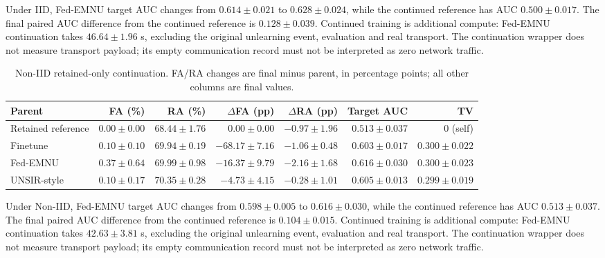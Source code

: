 Under IID, Fed-EMNU target AUC changes from $0.614 \pm 0.021$ to $0.628 \pm 0.024$, while the continued reference has AUC $0.500 \pm 0.017$. The final paired AUC difference from the continued reference is $0.128 \pm 0.039$. Continued training is additional compute: Fed-EMNU continuation takes $46.64 \pm 1.96$ s, excluding the original unlearning event, evaluation and real transport. The continuation wrapper does not measure transport payload; its empty communication record must not be interpreted as zero network traffic.

\begin{table}[H]\centering\scriptsize\setlength{\tabcolsep}{3pt}

\caption{Non-IID retained-only continuation. FA/RA changes are final minus parent, in percentage points; all other columns are final values.}

\label{tab:continuation-noniid}

\begin{tabular}{lrrrrrr}\toprule Parent & FA (\%) & RA (\%) & $\Delta$FA (pp) & $\Delta$RA (pp) & Target AUC & TV\\\midrule

Retained reference & $0.00 \pm 0.00$ & $68.44 \pm 1.76$ & $0.00 \pm 0.00$ & $-0.97 \pm 1.96$ & $0.513 \pm 0.037$ & 0 (self)\\

Finetune & $0.10 \pm 0.10$ & $69.94 \pm 0.19$ & $-68.17 \pm 7.16$ & $-1.06 \pm 0.48$ & $0.603 \pm 0.017$ & $0.300 \pm 0.022$\\

Fed-EMNU & $0.37 \pm 0.64$ & $69.99 \pm 0.98$ & $-16.37 \pm 9.79$ & $-2.16 \pm 1.68$ & $0.616 \pm 0.030$ & $0.300 \pm 0.023$\\

UNSIR-style & $0.10 \pm 0.17$ & $70.35 \pm 0.28$ & $-4.73 \pm 4.15$ & $-0.28 \pm 1.01$ & $0.605 \pm 0.013$ & $0.299 \pm 0.019$\\

\bottomrule\end{tabular}\end{table}

Under Non-IID, Fed-EMNU target AUC changes from $0.598 \pm 0.005$ to $0.616 \pm 0.030$, while the continued reference has AUC $0.513 \pm 0.037$. The final paired AUC difference from the continued reference is $0.104 \pm 0.015$. Continued training is additional compute: Fed-EMNU continuation takes $42.63 \pm 3.81$ s, excluding the original unlearning event, evaluation and real transport. The continuation wrapper does not measure transport payload; its empty communication record must not be interpreted as zero network traffic.

